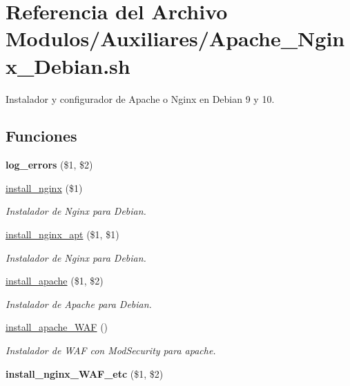 \hypertarget{Apache__Nginx__Debian_8sh}{}\section{Referencia del Archivo Modulos/\+Auxiliares/\+Apache\+\_\+\+Nginx\+\_\+\+Debian.sh}
\label{Apache__Nginx__Debian_8sh}


Instalador y configurador de Apache o Nginx en Debian 9 y 10.  


\subsection*{Funciones}
\begin{DoxyCompactItemize}
\item 
\mbox{\label{Apache__Nginx__Debian_8sh_a92067b58a8478c9841b2cd9b75ea3565}} 
{\bfseries log\+\_\+errors} (\$1, \$2)
\item 
\hyperlink{Apache__Nginx__Debian_8sh_a20b3bf0e3172e66928d551f5ab8cfac4}{install\+\_\+nginx} (\$1)
\begin{DoxyCompactList}\small\item\em Instalador de Nginx para Debian. \end{DoxyCompactList}\item 
\hyperlink{Apache__Nginx__Debian_8sh_a919a039d139e2c48f79368fc8a909d0d}{install\+\_\+nginx\+\_\+apt} (\$1, \$1)
\begin{DoxyCompactList}\small\item\em Instalador de Nginx para Debian. \end{DoxyCompactList}\item 
\hyperlink{Apache__Nginx__Debian_8sh_afafab8b1f22260753bb8a28972ad9fa5}{install\+\_\+apache} (\$1, \$2)
\begin{DoxyCompactList}\small\item\em Instalador de Apache para Debian. \end{DoxyCompactList}\item 
\mbox{\label{Apache__Nginx__Debian_8sh_a9b9e55b032e919096f0f651241d55f53}} 
\hyperlink{Apache__Nginx__Debian_8sh_a9b9e55b032e919096f0f651241d55f53}{install\+\_\+apache\+\_\+\+W\+AF} ()
\begin{DoxyCompactList}\small\item\em Instalador de W\+AF con Mod\+Security para apache. \end{DoxyCompactList}\item 
\mbox{\label{Apache__Nginx__Debian_8sh_a23436949ee6add4c036008836b5dfdb0}} 
{\bfseries install\+\_\+nginx\+\_\+\+W\+A\+F\+\_\+etc} (\$1, \$2)
\end{DoxyCompactItemize}


